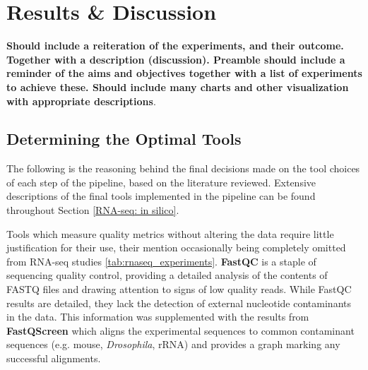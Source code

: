 \chapter{Results \& Discussion}

\textbf{Should include a reiteration of the experiments, and their outcome.  Together with a description (discussion).  Preamble should include a reminder of the aims and objectives together with a list of experiments to achieve these.  Should include many charts and other visualization with appropriate descriptions}.  




\section{Determining the Optimal Tools}

The following is the reasoning behind the final decisions made on the tool choices of each step of the pipeline, based on the literature reviewed. Extensive descriptions of the final tools implemented in the pipeline can be found throughout Section \ref{RNA-seq: in silico}.

Tools which measure quality metrics without altering the data require little justification for their use, their mention occasionally being completely omitted from RNA-seq studies \autoref{tab:rnaseq_experiments}. \textbf{FastQC} is a staple of sequencing quality control, providing a detailed analysis of the contents of FASTQ files and drawing attention to signs of low quality reads. While FastQC results are detailed, they lack the detection of external nucleotide contaminants in the data. This information was supplemented with the results from \textbf{FastQScreen} which aligns the experimental sequences to common contaminant sequences (e.g. mouse, \textit{Drosophila}, rRNA) and provides a graph marking any successful alignments.

